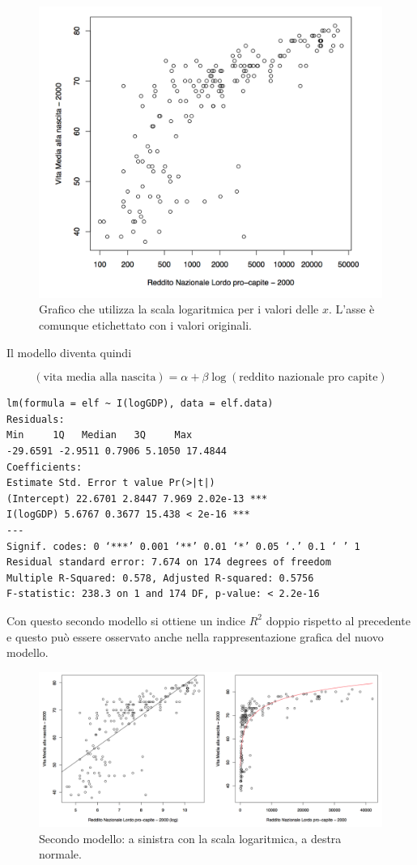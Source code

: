 \begin{figure}[htbp]
	\centering
	\includegraphics[width=.6\textwidth]{./notes/immagini/l7-fig7.png}
	\caption{Grafico che utilizza la scala logaritmica per i valori delle $ x $. L'asse è comunque etichettato con i valori originali.}
\end{figure}

Il modello diventa quindi

$$
(\text{vita media alla nascita}) = \alpha + \beta \log(\text{reddito nazionale pro capite})
$$

\begin{verbatim}
lm(formula = elf ~ I(logGDP), data = elf.data)
Residuals:
Min     1Q   Median   3Q     Max
-29.6591 -2.9511 0.7906 5.1050 17.4844
Coefficients:
Estimate Std. Error t value Pr(>|t|)
(Intercept) 22.6701 2.8447 7.969 2.02e-13 *** 
I(logGDP) 5.6767 0.3677 15.438 < 2e-16 ***
---
Signif. codes: 0 ‘***’ 0.001 ‘**’ 0.01 ‘*’ 0.05 ‘.’ 0.1 ‘ ’ 1
Residual standard error: 7.674 on 174 degrees of freedom 
Multiple R-Squared: 0.578, Adjusted R-squared: 0.5756 
F-statistic: 238.3 on 1 and 174 DF, p-value: < 2.2e-16
\end{verbatim}

Con questo secondo modello si ottiene un indice $ R^2 $ doppio rispetto al precedente e questo può essere osservato anche nella rappresentazione grafica del nuovo modello.

\begin{figure}[htbp]
	\centering
	\includegraphics[width=.9\textwidth]{./notes/immagini/l7-fig8.png}
	\caption{Secondo modello: a sinistra con la scala logaritmica, a destra normale.}
\end{figure}

